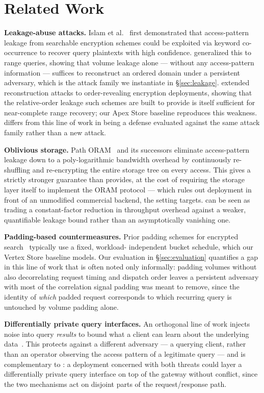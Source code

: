 \section{Related Work}
\label{sec:related-work}

\smallskip
\noindent\textbf{Leakage-abuse attacks.} Islam et al.~\cite{islam2012access}
first demonstrated that access-pattern leakage from searchable encryption
schemes could be exploited via keyword co-occurrence to recover query
plaintexts with high confidence. \citet{kellaris2016generic} generalized
this to range queries, showing that volume leakage alone --- without any
access-pattern information --- suffices to reconstruct an ordered domain
under a persistent adversary, which is the attack family we instantiate in
\S\ref{sec:leakage}. \citet{grubbs2018pumpup} extended reconstruction
attacks to order-revealing encryption deployments, showing that the
relative-order leakage such schemes are built to provide is itself
sufficient for near-complete range recovery; our Apex Store baseline
reproduces this weakness. \sysname{} differs from this line of work in
being a defense evaluated against the same attack family rather than a new
attack.

\smallskip
\noindent\textbf{Oblivious storage.} Path ORAM~\cite{stefanov2018path} and
its successors eliminate access-pattern leakage down to a
poly-logarithmic bandwidth overhead by continuously re-shuffling and
re-encrypting the entire storage tree on every access. This gives a
strictly stronger guarantee than \sysname{} provides, at the cost of
requiring the storage layer itself to implement the ORAM protocol ---
which rules out deployment in front of an unmodified commercial backend,
the setting \sysname{} targets. \sysname{} can be seen as trading a
constant-factor reduction in throughput overhead against a weaker,
quantifiable leakage bound rather than an asymptotically vanishing one.

\smallskip
\noindent\textbf{Padding-based countermeasures.} Prior padding schemes for
encrypted search~\cite{grubbs2018pumpup} typically use a fixed, workload-
independent bucket schedule, which our Vertex Store baseline models. Our
evaluation in \S\ref{sec:evaluation} quantifies a gap in this line of work
that is often noted only informally: padding volumes without also
decorrelating request timing and dispatch order leaves a persistent
adversary with most of the correlation signal padding was meant to
remove, since the identity of \emph{which} padded request corresponds to
which recurring query is untouched by volume padding alone.

\smallskip
\noindent\textbf{Differentially private query interfaces.} An orthogonal
line of work injects noise into query \emph{results} to bound what a
client can learn about the underlying data~\cite{narayan2019dp}. This
protects against a different adversary --- a querying client, rather than
an operator observing the access pattern of a legitimate query --- and is
complementary to \sysname{}: a deployment concerned with both threats
could layer a differentially private query interface on top of the
\sysname{} gateway without conflict, since the two mechanisms act on
disjoint parts of the request/response path.
